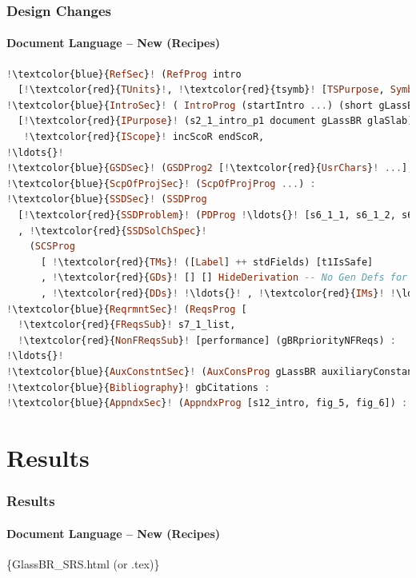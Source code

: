 \documentclass{beamer}
\begin{document}
\begin{frame}[fragile]

\frametitle{Design Changes}
\framesubtitle{Document Language -- New (Recipes)}

\begin{lstlisting}[language=Haskell, frame=single, showstringspaces=false, basicstyle=\scriptsize, escapechar=!]
!\textcolor{blue}{RefSec}! (RefProg intro 
  [!\textcolor{red}{TUnits}!, !\textcolor{red}{tsymb}! [TSPurpose, SymbOrder], !\textcolor{red}{TAandA}!]) :
!\textcolor{blue}{IntroSec}! ( IntroProg (startIntro ...) (short gLassBR)
  [!\textcolor{red}{IPurpose}! (s2_1_intro_p1 document gLassBR glaSlab),
   !\textcolor{red}{IScope}! incScoR endScoR,
!\ldots{}!
!\textcolor{blue}{GSDSec}! (GSDProg2 [!\textcolor{red}{UsrChars}! ...], !\textcolor{red}{SystCons}! [] []]) :
!\textcolor{blue}{ScpOfProjSec}! (ScpOfProjProg ...) :
!\textcolor{blue}{SSDSec}! (SSDProg
  [!\textcolor{red}{SSDProblem}! (PDProg !\ldots{}! [s6_1_1, s6_1_2, s6_1_3])
  , !\textcolor{red}{SSDSolChSpec}!
    (SCSProg
      [ !\textcolor{red}{TMs}! ([Label] ++ stdFields) [t1IsSafe]
      , !\textcolor{red}{GDs}! [] [] HideDerivation -- No Gen Defs for GlassBR
      , !\textcolor{red}{DDs}! !\ldots{}! , !\textcolor{red}{IMs}! !\ldots{}! ])]) :
!\textcolor{blue}{ReqrmntSec}! (ReqsProg [
  !\textcolor{red}{FReqsSub}! s7_1_list, 
  !\textcolor{red}{NonFReqsSub}! [performance] (gBRpriorityNFReqs) :
!\ldots{}!
!\textcolor{blue}{AuxConstntSec}! (AuxConsProg gLassBR auxiliaryConstants) :
!\textcolor{blue}{Bibliography}! gbCitations :
!\textcolor{blue}{AppndxSec}! (AppndxProg [s12_intro, fig_5, fig_6]) : []
\end{lstlisting}

\end{frame}


\section[Results]{Results}


\begin{frame}[fragile]

\frametitle{Results}
\framesubtitle{Document Language -- New (Recipes)}

\{GlassBR\_SRS.html (or .tex)\}

\end{frame}
\end{document}
